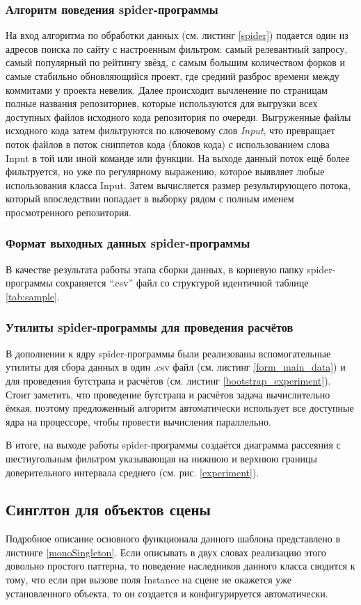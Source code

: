 \subsubsection*{Алгоритм поведения spider-программы}
На вход алгоритма по обработки данных (см. листинг \ref{spider}) подается один из адресов поиска по сайту с настроенным фильтром: самый релевантный запросу, самый популярный по рейтингу звёзд, с самым большим количеством форков и самые стабильно обновляющийся проект, где средний разброс времени между коммитами у проекта невелик. Далее происходит вычленение по страницам полные названия репозиториев, которые используются для выгрузки всех доступных файлов исходного кода репозитория по очереди. Выгруженные файлы исходного кода затем фильтруются по ключевому слов \textit{Input}, что превращает поток файлов в поток сниппетов кода (блоков кода) с использованием слова Input в той или иной команде или функции. На выходе данный поток ещё более фильтруется, но уже по регулярному выражению, которое выявляет любые использования класса Input. Затем вычисляется размер результирующего потока, который впоследствии попадает в выборку рядом с полным именем просмотренного репозитория.

\subsubsection*{Формат выходных данных spider-программы}
В качестве результата работы этапа сборки данных, в корневую папку spider-программы сохраняется ``.csv'' файл со структурой идентичной таблице \ref{tab:sample}.

\subsubsection*{Утилиты spider-программы для проведения расчётов}
В дополнении к ядру spider-программы были реализованы вспомогательные утилиты для сбора данных в один .csv файл (см. листинг \ref{form_main_data}) и для проведения бутстрапа и расчётов (см. листинг \ref{bootstrap_experiment}). Стоит заметить, что проведение бутстрапа и расчётов задача вычислительно ёмкая, поэтому предложенный алгоритм автоматически использует все доступные ядра на процессоре, чтобы провести вычисления параллельно. 

В итоге, на выходе работы spider-программы создаётся диаграмма рассеяния с шестиугольным фильтром указывающая на нижнюю и верхнюю границы доверительного интервала среднего (см. рис. \ref{experiment}).

\subsection{Синглтон для объектов сцены}
Подробное описание основного функционала данного шаблона представлено в листинге \ref{monoSingleton}. Если описывать в двух словах реализацию этого довольно простого паттерна, то поведение наследников данного класса сводится к тому, что если при вызове поля Instance на сцене не окажется уже установленного объекта, то он создается и конфигурируется автоматически.

